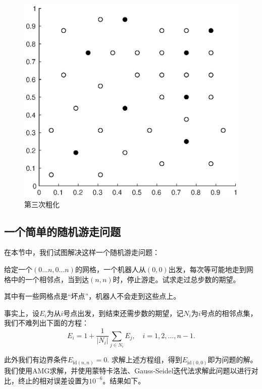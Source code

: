 \documentclass[lang=cn,10pt]{elegantbook}
\begin{document}
\begin{figure}[H]
\begin{minipage}[t]{0.32\linewidth}
  \end{minipage}
  \hspace{.5em}
  \begin{minipage}[t]{0.32\linewidth}
    \centering
    \includegraphics[width=0.9\linewidth]{figure/4-2-2.eps}
    \caption*{\small 第三次粗化}
  \end{minipage}
\end{figure}

\subsection{一个简单的随机游走问题}

在本节中，我们试图解决这样一个随机游走问题：

\begin{postulate}
  给定一个$(0...n,0...n)$的网格，一个机器人从$(0,0)$出发，每次等可能地走到网格中的一个相邻点，当到达$(n,n)$时，停止游走。试求走过总步数的期望。

  其中有一些网格点是“坏点”，机器人不会走到这些点上。
\end{postulate}

事实上，设$E_i$为从$i$号点出发，到结束还需步数的期望，记$N_i$为$i$号点的相邻点集，我们不难列出下面的方程：
\begin{equation}
  E_i=1+\frac{1}{|N_i|}\sum_{j\in N_i}E_j,\quad i=1,2,...,n-1.
\end{equation}

此外我们有边界条件$E_{\text{id}(n,n)}=0$. 求解上述方程组，得到$E_{\text{id}(0,0)}$即为问题的解。我们使用AMG求解，并使用蒙特卡洛法、Gauss-Seidel迭代法求解此问题以进行对比，终止的相对误差设置为$10^{-6}$。结果如下。
\end{document}

